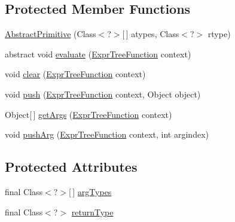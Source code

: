 \subsection*{Protected Member Functions}
\begin{DoxyCompactItemize}
\item 
\hyperlink{classnet_1_1sf_1_1jclec_1_1exprtree_1_1fun_1_1_abstract_primitive_a9524b86b2835da7bdf83ff4fe51cae8f}{Abstract\-Primitive} (Class$<$?$>$\mbox{[}$\,$\mbox{]} atypes, Class$<$?$>$ rtype)
\item 
abstract void \hyperlink{classnet_1_1sf_1_1jclec_1_1exprtree_1_1fun_1_1_abstract_primitive_aab695f920997a9f1d873ab9b6f3ca246}{evaluate} (\hyperlink{classnet_1_1sf_1_1jclec_1_1exprtree_1_1fun_1_1_expr_tree_function}{Expr\-Tree\-Function} context)
\item 
void \hyperlink{classnet_1_1sf_1_1jclec_1_1exprtree_1_1fun_1_1_abstract_primitive_acf8deec8d668bba6dffe1562c7323580}{clear} (\hyperlink{classnet_1_1sf_1_1jclec_1_1exprtree_1_1fun_1_1_expr_tree_function}{Expr\-Tree\-Function} context)
\item 
void \hyperlink{classnet_1_1sf_1_1jclec_1_1exprtree_1_1fun_1_1_abstract_primitive_ab949217ef353c47de03730e0e63890ef}{push} (\hyperlink{classnet_1_1sf_1_1jclec_1_1exprtree_1_1fun_1_1_expr_tree_function}{Expr\-Tree\-Function} context, Object object)
\item 
Object\mbox{[}$\,$\mbox{]} \hyperlink{classnet_1_1sf_1_1jclec_1_1exprtree_1_1fun_1_1_abstract_primitive_a538b47566b8f08650cf367adad093432}{get\-Args} (\hyperlink{classnet_1_1sf_1_1jclec_1_1exprtree_1_1fun_1_1_expr_tree_function}{Expr\-Tree\-Function} context)
\item 
void \hyperlink{classnet_1_1sf_1_1jclec_1_1exprtree_1_1fun_1_1_abstract_primitive_ae925715073c8db3caa48f1470ee377e1}{push\-Arg} (\hyperlink{classnet_1_1sf_1_1jclec_1_1exprtree_1_1fun_1_1_expr_tree_function}{Expr\-Tree\-Function} context, int argindex)
\end{DoxyCompactItemize}
\subsection*{Protected Attributes}
\begin{DoxyCompactItemize}
\item 
final Class$<$?$>$\mbox{[}$\,$\mbox{]} \hyperlink{classnet_1_1sf_1_1jclec_1_1exprtree_1_1fun_1_1_abstract_primitive_a5c366872f0b89c0ae45f08207c57f2de}{arg\-Types}
\item 
final Class$<$?$>$ \hyperlink{classnet_1_1sf_1_1jclec_1_1exprtree_1_1fun_1_1_abstract_primitive_adc55259ee3939d073f17e70ddb428491}{return\-Type}
\end{DoxyCompactItemize}


